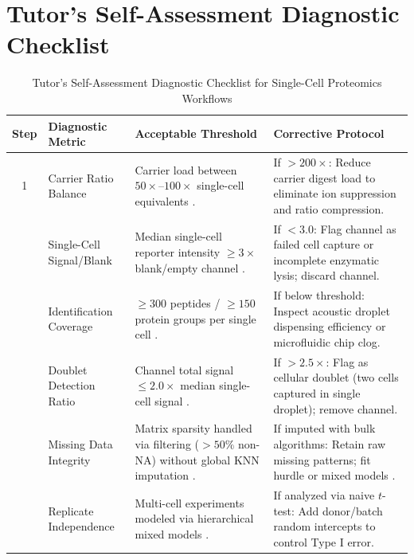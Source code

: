 \documentclass[11pt,twoside,openright]{book}
\begin{document}
\section{Tutor's Self-Assessment Diagnostic Checklist}

\begin{table}[ht]
\centering
\caption{Tutor's Self-Assessment Diagnostic Checklist for Single-Cell Proteomics Workflows}
\label{tab:scp_checklist}
\small
\begin{tabularx}{\textwidth}{c p{3.8cm} p{4.2cm} X}
\toprule
\textbf{Step} & \textbf{Diagnostic Metric} & \textbf{Acceptable Threshold} & \textbf{Corrective Protocol} \\
\midrule
1 & Carrier Ratio Balance & Carrier load between $50\times$--$100\times$ single-cell equivalents \cite{slavov2021scope2}. & If $>200\times$: Reduce carrier digest load to eliminate ion suppression and ratio compression. \\
\addlinespace
2 & Single-Cell Signal/Blank & Median single-cell reporter intensity $\ge 3\times$ blank/empty channel \cite{vanderaa2021scp}. & If $<3.0$: Flag channel as failed cell capture or incomplete enzymatic lysis; discard channel. \\
\addlinespace
3 & Identification Coverage & $\ge 300$ peptides / $\ge 150$ protein groups per single cell \cite{schoof2021single}. & If below threshold: Inspect acoustic droplet dispensing efficiency or microfluidic chip clog. \\
\addlinespace
4 & Doublet Detection Ratio & Channel total signal $\le 2.0\times$ median single-cell signal \cite{woo2022high}. & If $>2.5\times$: Flag as cellular doublet (two cells captured in single droplet); remove channel. \\
\addlinespace
5 & Missing Data Integrity & Matrix sparsity handled via filtering ($>50\%$ non-NA) without global KNN imputation \cite{brunner2022ultra}. & If imputed with bulk algorithms: Retain raw missing patterns; fit hurdle or mixed models \cite{choi2014msstats}. \\
\addlinespace
6 & Replicate Independence & Multi-cell experiments modeled via hierarchical mixed models \cite{amenta2022pseudoreplication}. & If analyzed via naive $t$-test: Add donor/batch random intercepts to control Type I error. \\
\bottomrule
\end{tabularx}
\end{table}
\end{document}
